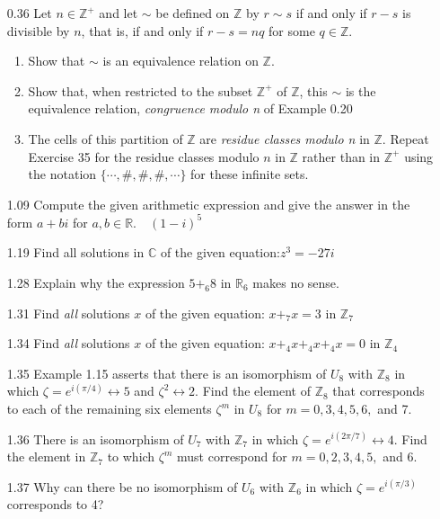 \documentclass[12pt]{article}
\newcommand{\Z}{\mathds{Z}}
\newcommand{\C}{\mathbb{C}}
\newcommand{\R}{\mathbb{R}}
\begin{document}
\begin{enumerate}
	\item[0.36] Let $n \in \Z^+$ and let $\sim$ be defined on $\Z$ by $r \sim s$ if and only if $r-s$ is divisible by $n$, that is, if and only if $r-s=nq$ for some $q \in \Z$.
	\begin{enumerate}
		\item Show that $\sim$ is an equivalence relation on $\Z$.
		\item Show that, when restricted to the subset $\Z^+$ of $\Z$, this $\sim$ is the equivalence relation, \textit{congruence modulo n} of Example 0.20
		\item The cells of this partition of $\Z$ are \textit{residue classes modulo n} in $\Z$. Repeat Exercise 35 for the residue classes modulo $n$ in $\Z$ rather than in $\Z^+$ using the notation $\{\cdots,\#,\#,\#,\cdots\}$ for these infinite sets.
	\end{enumerate}
	\item[1.09] Compute the given arithmetic expression and give the answer in the form $a + bi$ for $a,b \in \R .\quad (1-i)^5 $
		
	\item[1.19] Find all solutions in $\C$ of the given equation:\quad $z^3 = -27i$
	
	\item[1.28] Explain why the expression $5+_6 8$ in $\R_6$ makes no sense.
	
	\item[1.31] Find \textit{all} solutions $x$ of the given equation: \quad $x+_7x=3$ in $\Z_7$
	
	\item[1.34] Find \textit{all} solutions $x$ of the given equation: \quad $x+_4x+_4x+_4x=0$ in $\Z_4$
	
	\item[1.35] Example 1.15 asserts that there is an isomorphism of $U_8$ with $\Z_8$ in which $\zeta = e^{i(\pi/4)} \leftrightarrow 5$ and $\zeta^2 \leftrightarrow 2$. Find the element of $\Z_8$ that corresponds to each of the remaining six elements $\zeta^m$ in $U_8$ for $m=0,3,4,5,6,$ and 7.
	
	\item[1.36] There is an isomorphism of $U_7$ with $\Z_7$ in which $\zeta = e^{i(2\pi/7)} \leftrightarrow 4$. Find the element in $\Z_7$ to which $\zeta^m$ must correspond for $m=0,2,3,4,5,$ and 6.
	
	\item[1.37] Why can there be no isomorphism of $U_6$ with $\Z_6$ in which $\zeta=e^{i(\pi/3)}$ corresponds to 4?
	
\end{enumerate}
\end{document}
